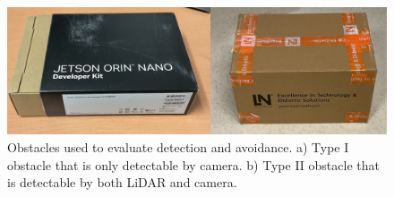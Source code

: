 \documentclass[conference]{IEEEtran}
\begin{document}
\begin{figure}[h!]
    \centering
    \includegraphics[scale=0.2]{paper_obstacle_image.png}
    \caption{Obstacles used to evaluate detection and avoidance. a) Type I obstacle that is only detectable by camera. b) Type II obstacle that is detectable by both LiDAR and camera.}
    \label{Figure 10}
\end{figure}




\end{document}
